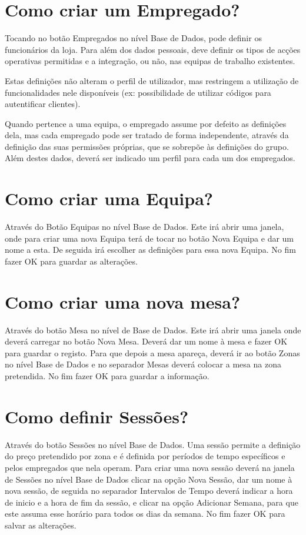 \documentclass[a4paper,11pt,openany]{memoir}
\begin{document}
\section{Como criar um Empregado?}
Tocando no botão Empregados no nível Base de Dados, pode definir os funcionários
da loja. Para além dos dados pessoais, deve definir os tipos de acções operativas
permitidas e a integração, ou não, nas equipas de trabalho existentes.

Estas definições não alteram o perfil de utilizador, mas restringem a utilização de
funcionalidades nele disponíveis (ex: possibilidade de utilizar códigos para autentificar
clientes).

Quando pertence a uma equipa, o empregado assume por defeito as
definições dela, mas cada empregado pode ser tratado de forma independente,
através da definição das suas permissões próprias, que se sobrepõe às definições
do grupo. Além destes dados, deverá ser indicado um perfil para cada um dos
empregados.

\section{Como criar uma Equipa?}
Através do Botão Equipas no nível Base de Dados. Este irá abrir uma janela, onde
para criar uma nova Equipa terá de tocar no botão Nova Equipa e dar um nome a
esta. De seguida irá escolher as definições para essa nova Equipa. No fim fazer OK
para guardar as alterações.

\section{Como criar uma nova mesa?}

Através do botão Mesa no nível de Base de Dados. Este irá abrir uma janela onde
deverá carregar no botão Nova Mesa. Deverá dar um nome à mesa e fazer OK para
guardar o registo. Para que depois a mesa apareça, deverá ir ao botão Zonas no
nível Base de Dados e no separador Mesas deverá colocar a mesa na zona
pretendida. No fim fazer OK para guardar a informação.

\section{Como definir Sessões?}
Através do botão Sessões no nível Base de Dados. Uma sessão permite a definição
do preço pretendido por zona e é definida por períodos de tempo específicos e pelos
empregados que nela operam. Para criar uma nova sessão deverá na janela de
Sessões no nível Base de Dados clicar na opção Nova Sessão, dar um nome à nova
sessão, de seguida no separador Intervalos de Tempo deverá indicar a hora de
inicio e a hora de fim da sessão, e clicar na opção Adicionar Semana, para que este
assuma esse horário para todos os dias da semana. No fim fazer OK para salvar as
alterações.
\end{document}
